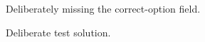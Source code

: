 \documentclass{physicsquiz}
\begin{document}
\begin{quizquestionbank}[2]
  \begin{quizquestion}[id=missing-correct,topic=waves,difficulty=foundation,marks=1,tags={wave}]
    Deliberately missing the correct-option field. 
  \end{quizquestion}
  \begin{quizsolution}Deliberate test solution.\end{quizsolution}
\end{quizquestionbank}
\end{document}

